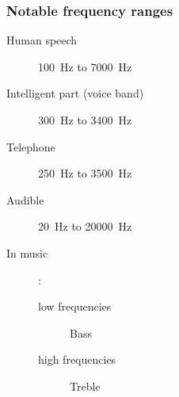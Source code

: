 \documentclass[svgnames,x11names]{beamer}
\begin{document}
\begin{frame}
  \frametitle{Notable frequency ranges}
  \begin{description}
  \item[Human speech] \SI{100}{\hertz} to \SI{7000}{\hertz}
  \item[Intelligent part (voice band)] \SI{300}{\hertz} to \SI{3400}{\hertz}
  \item[Telephone] \SI{250}{\hertz} to \SI{3500}{\hertz}
  \item[Audible] \SI{20}{\hertz}  to \SI{20000}{\hertz}
  \item[In music]:
    \begin{description}
    \item[low frequencies] Bass
    \item[high frequencies] Treble
    \end{description}

  \end{description}
\end{frame}
    

\end{document}
